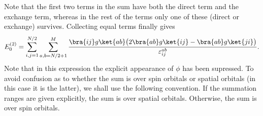 Note that the first two terms in the sum have both the direct term and the exchange term, whereas in the rest of the terms only one of these (direct or exchange) survives.
Collecting equal terms finally gives
\begin{equation}
\label{eq:RMP2}
 E^{(2)}_0 = \sum_{i,j=1}^{N/2}\sum_{a,b=N/2+1}^{M}\frac{\bra{ij}g\ket{ab}\big(2\bra{ab}g\ket{ij} - \bra{ab}g\ket{ji}\big)}{\varepsilon^{ab}_{ij}}.
\end{equation}
Note that in this expression the explicit appearance of $\phi$ has been supressed. To avoid
confusion as to whether the sum is over spin orbitals or spatial orbitals (in this case it
is the latter), we shall use the following convention. If the summation ranges are given
explicitly, the sum is over spatial orbitals. Otherwise, the sum is over spin orbitals.




